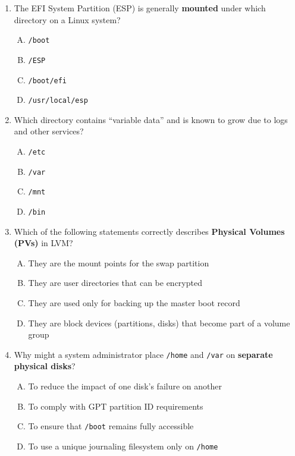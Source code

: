 \documentclass[a4paper]{report}
\begin{document}
\begin{enumerate}[1.]
    \item The EFI System Partition (ESP) is generally \textbf{mounted} under which directory on a Linux system?  
    \begin{enumerate}[A)]
        \item \texttt{/boot}  
        \item \texttt{/ESP}  
        \item \texttt{/boot/efi}  
        \item \texttt{/usr/local/esp}  
    \end{enumerate}

    \item Which directory contains “variable data” and is known to grow due to logs and other services?  
    \begin{enumerate}[A)]
        \item \texttt{/etc}  
        \item \texttt{/var}  
        \item \texttt{/mnt}  
        \item \texttt{/bin}  
    \end{enumerate}

    \item Which of the following statements correctly describes \textbf{Physical Volumes (PVs)} in LVM?  
    \begin{enumerate}[A)]
        \item They are the mount points for the swap partition  
        \item They are user directories that can be encrypted  
        \item They are used only for backing up the master boot record  
        \item They are block devices (partitions, disks) that become part of a volume group  
    \end{enumerate}

    \item Why might a system administrator place \texttt{/home} and \texttt{/var} on \textbf{separate physical disks}?  
    \begin{enumerate}[A)]
        \item To reduce the impact of one disk’s failure on another  
        \item To comply with GPT partition ID requirements  
        \item To ensure that \texttt{/boot} remains fully accessible  
        \item To use a unique journaling filesystem only on \texttt{/home}  
    \end{enumerate}


\end{enumerate}
\end{document}
